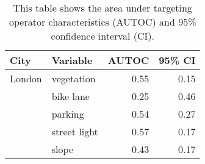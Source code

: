 \begin{table}[!htp]\centering
\caption{This table shows the area under targeting operator characteristics (AUTOC) and 95\% confidence interval (CI).}
\label{result:tab:autoc}
\scriptsize
\begin{tabular}{llrr}\toprule
City & Variable & AUTOC & 95\% CI \\\midrule
London & vegetation & 0.55 & 0.15 \\
 & bike lane & 0.25 & 0.46 \\
 & parking & 0.54 & 0.27 \\
 & street light & 0.57 & 0.17 \\
 & slope & 0.43 & 0.17 \\
\bottomrule
\end{tabular}
\end{table}
